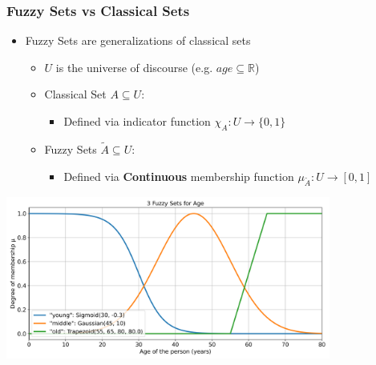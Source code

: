 \documentclass[
	10pt,
	t		%
]{beamer}
\begin{document}
\begin{frame}
	\frametitle{Fuzzy Sets vs Classical Sets}
	\begin{itemize}
		\item Fuzzy Sets are generalizations of classical sets
		      \begin{itemize}
			      \item $U$ is the universe of discourse (e.g. $age \subseteq \mathbb{R}$)
			      \item Classical Set $A \subseteq U$:
			            \begin{itemize}
				            \item Defined via indicator function $\chi_A : U \rightarrow \{0,1\}$
			            \end{itemize}
			      \item Fuzzy Sets $\tilde{A} \subseteq U$:
			            \begin{itemize}
				            \item Defined via \textbf{Continuous} membership function $\mu_{\tilde{A}} : U  \rightarrow [0,1]$
			            \end{itemize}
		      \end{itemize}
	\end{itemize}
	\begin{center}
		\includegraphics[width=0.8\textwidth,trim={0 0.1cm 0 1.2cm},clip]{figures/age-fuzzy-sets.png}
	\end{center}
\end{frame}
\end{document}
